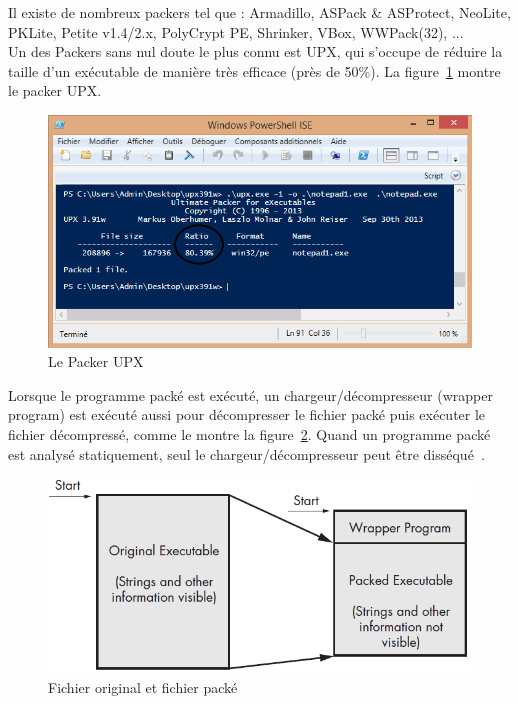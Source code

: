 Il existe de nombreux packers tel que : Armadillo, ASPack \& ASProtect, NeoLite, PKLite, Petite v1.4/2.x, PolyCrypt PE, Shrinker, VBox, WWPack(32), ...\\

Un des Packers sans nul doute le plus connu est UPX, qui s'occupe de réduire la taille d'un exécutable de manière très efficace (près de 50\%). La figure~\ref{fig :UPX} montre le packer UPX.
\begin{figure}[H]
\begin{center}
\includegraphics[scale=0.7]{Figures/UPX.png}
\caption{Le Packer UPX}
\label{fig :UPX} 
\end{center}
\end{figure}
Lorsque le programme packé est exécuté, un chargeur/décompresseur (wrapper program) est exécuté aussi pour décompresser le fichier packé puis exécuter le fichier décompressé, comme le montre la figure~\ref{fig :PACK}. Quand un  programme packé est analysé statiquement, seul le chargeur/décompresseur peut être disséqué~\cite{ANA}.
\begin{figure}[H]
\begin{center}
\includegraphics[scale=0.6]{Figures/PACK.png}
\caption{Fichier original et fichier packé}
\label{fig :PACK} 
\end{center}
\end{figure}
